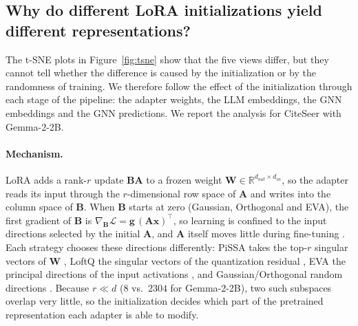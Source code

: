 \documentclass[a4paper,fleqn]{cas-sc}
\DeclareRobustCommand{\revcommon}[2][]{\textcolor{revshared}{#2}} %
\begin{document}
\subsection{Why do different LoRA initializations yield different representations?}\label{sec:initDiversity}

\revcommon[R1,R2,R4]{The t-SNE plots in Figure~\ref{fig:tsne} show that the five views differ, but they cannot tell whether the difference is caused by the initialization or by the randomness of training. We therefore follow the effect of the initialization through each stage of the pipeline: the adapter weights, the LLM embeddings, the GNN embeddings and the GNN predictions. We report the analysis for CiteSeer with Gemma-2-2B.}

\paragraph{\revcommon{Mechanism.}}
\revcommon[R1,R2,R4]{LoRA adds a rank-$r$ update $\mathbf{B}\mathbf{A}$ to a frozen weight $\mathbf{W}\in\mathbb{R}^{d_{out}\times d_{in}}$, so the adapter reads its input through the $r$-dimensional row space of $\mathbf{A}$ and writes into the column space of $\mathbf{B}$. When $\mathbf{B}$ starts at zero (Gaussian, Orthogonal and EVA), the first gradient of $\mathbf{B}$ is $\nabla_{\mathbf{B}}\mathcal{L}=\mathbf{g}\,(\mathbf{A}\mathbf{x})^{\top}$, so learning is confined to the input directions selected by the initial $\mathbf{A}$, and $\mathbf{A}$ itself moves little during fine-tuning \citep{zhu2024asymmetry}. Each strategy chooses these directions differently: PiSSA takes the top-$r$ singular vectors of $\mathbf{W}$ \citep{meng2024pissa}, LoftQ the singular vectors of the quantization residual \citep{li2023loftq}, EVA the principal directions of the input activations \citep{paischer2024eva}, and Gaussian/Orthogonal random directions \citep{Hu2021LoRA, zhang2025orthogonal}. Because $r\ll d$ ($8$ vs.\ $2304$ for Gemma-2-2B), two such subspaces overlap very little, so the initialization decides which part of the pretrained representation each adapter is able to modify.}
\end{document}
